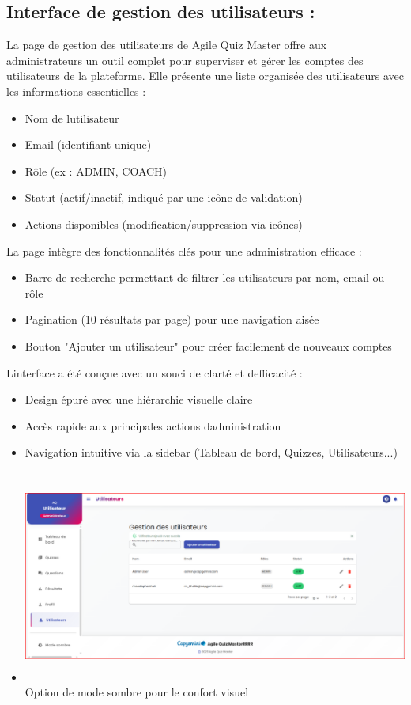 \documentclass[12pt,a4paper,twoside]{report}
\begin{document}
\hypertarget{interface-de-gestion-des-utilisateurs}{%
\subsection{Interface de gestion des utilisateurs
:}\label{interface-de-gestion-des-utilisateurs}}

La page de gestion des utilisateurs de Agile Quiz Master offre aux
administrateurs un outil complet pour superviser et gérer les comptes
des utilisateurs de la plateforme. Elle présente une liste organisée des
utilisateurs avec les informations essentielles :

\begin{itemize}
\item
  Nom de l\textquotesingle utilisateur
\item
  Email (identifiant unique)
\item
  Rôle (ex : ADMIN, COACH)
\item
  Statut (actif/inactif, indiqué par une icône de validation)
\item
  Actions disponibles (modification/suppression via icônes)
\end{itemize}

La page intègre des fonctionnalités clés pour une administration
efficace :

\begin{itemize}
\item
  Barre de recherche permettant de filtrer les utilisateurs par nom,
  email ou rôle
\item
  Pagination (10 résultats par page) pour une navigation aisée
\item
  Bouton "Ajouter un utilisateur" pour créer facilement de nouveaux
  comptes
\end{itemize}

L\textquotesingle interface a été conçue avec un souci de clarté et
d\textquotesingle efficacité :

\begin{itemize}
\item
  Design épuré avec une hiérarchie visuelle claire
\item
  Accès rapide aux principales actions d\textquotesingle administration
\item
  Navigation intuitive via la sidebar (Tableau de bord, Quizzes,
  Utilisateurs...)
\item
  \includegraphics[width=6.3in,height=2.75972in]{latex_media/media/image53.png}Option
  de mode sombre pour le confort visuel
\end{itemize}
\end{document}
